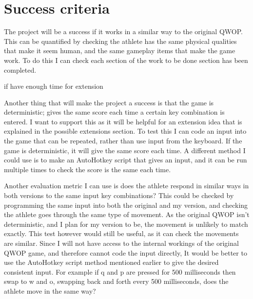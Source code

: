 \documentclass[12pt,a4paper,twoside]{article}
\begin{document}
\section*{Success criteria}



The project will be a success if it works in a similar way to the original QWOP. This can be quantified by checking the athlete has the same physical qualities that make it seem human, and the same gameplay items that make the game work. To do this I can check each section of the work to be done section has been completed.

if have enough time for extension

Another thing that will make the project a success is that the game is deterministic; gives the same score each time a certain key combination is entered. I want to support this as it will be helpful for an extension idea that is explained in the possible extensions section.
To test this I can code an input into the game that can be repeated, rather than use input from the keyboard. If the game is deterministic, it will give the same score each time. A different method I could use is to make an AutoHotkey script that gives an input, and it can be run multiple times to check the score is the same each time.

Another evaluation metric I can use is does the athlete respond in similar ways in both versions to the same input key combinations? This could be checked by programming the same input into both the original and my version, and checking the athlete goes through the same type of movement. 
As the original QWOP isn't deterministic, and I plan for my version to be, the movement is unlikely to match exactly. This test however would still be useful, as it can check the movements are similar.
Since I will not have access to the internal workings of the original QWOP game, and therefore cannot code the input directly, It would be better to use the AutoHotkey script method mentioned earlier to give the desired consistent input.
For example if q and p are pressed for 500 milliseconds then swap to w and o, swapping back and forth every 500 milliseconds, does the athlete move in the same way?
\end{document}
